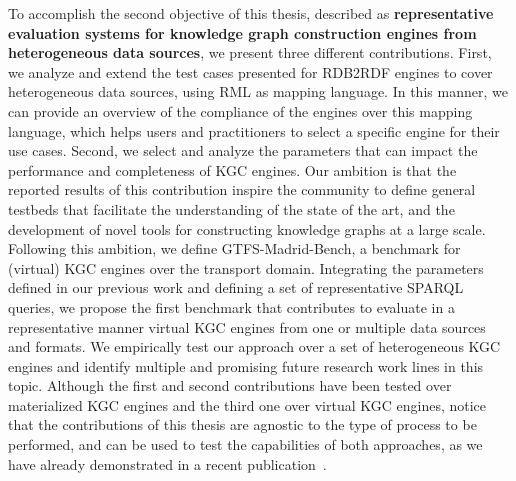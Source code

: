 To accomplish the second objective of this thesis, described as \textbf{representative evaluation systems for knowledge graph construction engines from heterogeneous data sources}, we present three different contributions. First, we analyze and extend the test cases presented for RDB2RDF engines to cover heterogeneous data sources, using RML as mapping language. In this manner, we can provide an overview of the compliance of the engines over this mapping language, which helps users and practitioners to select a specific engine for their use cases. Second, we select and analyze the parameters that can impact  the performance and completeness of KGC engines. Our ambition is that the reported results of this contribution inspire the community to define general testbeds that facilitate the understanding of the state of the art, and the development of novel tools for constructing knowledge graphs at a large scale. Following this ambition, we define  GTFS-Madrid-Bench, a benchmark for (virtual) KGC engines over the transport domain. Integrating the parameters defined in our previous work and defining a set of representative SPARQL queries, we propose the first benchmark that contributes to evaluate in a representative manner virtual KGC engines from one or multiple data sources and formats. We empirically test our approach over a set of heterogeneous KGC engines and identify multiple and promising future research work lines in this topic. Although the first and second contributions have been tested over materialized KGC engines and the third one over virtual KGC engines, notice that the contributions of this thesis are agnostic to the type of process to be performed, and can be used to test the capabilities of both approaches, as we have already demonstrated in a recent publication~\citep{arenas2021knowledge}.


